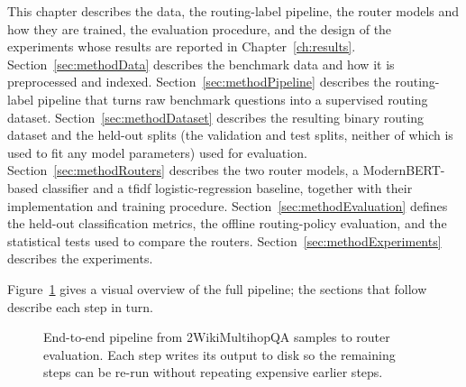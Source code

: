 \documentclass[english, bibtex]{kththesis}               %
\numberwithin{listing}{chapter}
\begin{document}
This chapter describes the data, the routing-label pipeline, the router models and how they are trained, the evaluation procedure, and the design of the experiments whose results are reported in Chapter~\ref{ch:results}. Section~\ref{sec:methodData} describes the benchmark data and how it is preprocessed and indexed. Section~\ref{sec:methodPipeline} describes the routing-label pipeline that turns raw benchmark questions into a supervised routing dataset. Section~\ref{sec:methodDataset} describes the resulting binary routing dataset and the held-out splits (the validation and test splits, neither of which is used to fit any model parameters) used for evaluation. Section~\ref{sec:methodRouters} describes the two router models, a ModernBERT-based classifier and a \gls{tfidf} logistic-regression baseline, together with their implementation and training procedure. Section~\ref{sec:methodEvaluation} defines the held-out classification metrics, the offline routing-policy evaluation, and the statistical tests used to compare the routers. Section~\ref{sec:methodExperiments} describes the experiments.

Figure~\ref{fig:methodPipeline} gives a visual overview of the full pipeline; the sections that follow describe each step in turn.

\begin{figure}[!ht]
\centering
{}
\caption{End-to-end pipeline from 2WikiMultihopQA samples to router evaluation. Each step writes its output to disk so the remaining steps can be re-run without repeating expensive earlier steps.}
\label{fig:methodPipeline}
\end{figure}
\end{document}
